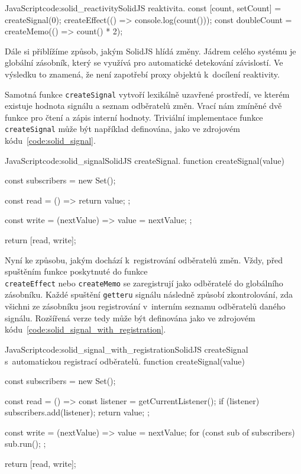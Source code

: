 \documentclass[
  master,
  program=ainf,
  tables=false,
  sourcecodes,
  glossaries,
  index
]{kidiplom}
\begin{document}
  \begin{kicode}{JavaScript}{code:solid_reactivity}{SolidJS reaktivita.}
    const [count, setCount] = createSignal(0);
    createEffect(() => console.log(count()));
    const doubleCount = createMemo(() => count() * 2);
  \end{kicode}

Dále si přiblížíme způsob, jakým SolidJS \cite{solidjs} hlídá změny. Jádrem celého systému je globální zásobník, který
se využívá pro automatické detekování závislostí. Ve výsledku to znamená, že není zapotřebí proxy objektů
k~docílení reaktivity.

Samotná funkce {\tt createSignal} vytvoří lexikálně uzavřené prostředí, ve kterém existuje hodnota
signálu a seznam odběratelů změn. Vrací nám zmíněné dvě funkce pro čtení a zápis interní hodnoty.
Triviální implementace funkce {\tt createSignal} může být například definována, jako ve zdrojovém 
kódu~\ref{code:solid_signal}.

  \begin{kicode}{JavaScript}{code:solid_signal}{SolidJS createSignal.}
    function createSignal(value) {
      const subscribers = new Set();

      const read = () => {
        return value;
      };

      const write = (nextValue) => {
        value = nextValue;
      };

      return [read, write];
    }
  \end{kicode}

Nyní ke způsobu, jakým dochází k~registrování odběratelů změn. Vždy, před spuštěním funkce poskytnuté do 
funkce \\{\tt createEffect} nebo {\tt createMemo} se zaregistrují jako odběratelé do globálního zásobníku. Každé spuštění
{\tt getteru} signálu následně způsobí zkontrolování, zda všichni ze zásobníku jsou registrování v~interním seznamu
odběratelů daného signálu. Rozšířená verze tedy může být definována jako ve zdrojovém kódu~\ref{code:solid_signal_with_registration}.

\begin{absolutelynopagebreak}
  \begin{kicode}{JavaScript}{code:solid_signal_with_registration}{SolidJS createSignal s~automatickou registrací odběratelů.}
    function createSignal(value) {
      const subscribers = new Set();

      const read = () => {
        const listener = getCurrentListener();
        if (listener) subscribers.add(listener);
        return value;
      };

      const write = (nextValue) => {
        value = nextValue;
        for (const sub of subscribers) sub.run();
      };

      return [read, write];
    }
\end{kicode}
\end{absolutelynopagebreak}
\end{document}
